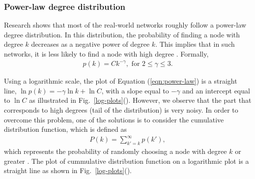 \documentclass[10pt,a4paper]{article}
\begin{document}
\subsubsection{Power-law degree distribution}
Research shows that most of the real-world networks roughly follow a power-law degree distribution. In this distribution, the probability of finding a node with degree $k$ decreases as a negative power of degree $k$. This implies that in such networks, it is less likely to find a node with high degree \citep{estrada2011structure}.
Formally,
\begin{eqnarray}
p(k) = C k^{-\gamma}, \text{ for } 2 \leq  \gamma \leq  3.
\label{eqn:power-law}
\end{eqnarray}

Using a logarithmic scale, the plot of Equation (\ref{eqn:power-law}) is a straight line, $\ln p(k) = -\gamma \ln k + \ln C $, with a slope equal to $-\gamma $ and an intercept equal to $\ln C$ as illustrated in Fig.~\ref{log-plots}(). However, we observe that the part that corresponds to high degrees (tail of the distribution) is very noisy. In order to overcome this problem, one of the solutions is to consider the cumulative distribution function, which is defined as 
\begin{eqnarray*}
	P(k) = \sum_{k'=k}^\infty p(k'),
\end{eqnarray*}
which represents the probability of randomly choosing a node with degree $k$ or greater \citep{estrada2011structure}. The plot of cummulative distribution function on a logarithmic plot is a straight line as shown in Fig.~\ref{log-plots}().
\end{document}
